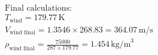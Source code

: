 \begin{homeworkProblem}
\begin{align*}
		\text{Final calculations:}                                                                                                                                         \\
		T_{\text{wind}} = 179.77 \, \text{K}                                                                                                                               \\
		V_{\text{wind final}} = 1.3546 \times 268.83 = 364.07 \, \text{m/s}                                                                                                \\
		\rho_{\text{wind final}} = \frac{75000}{287 \times 179.77} = 1.454 \, \text{kg/m}^3                                                                                \\
		\end{align*}
\end{homeworkProblem}


